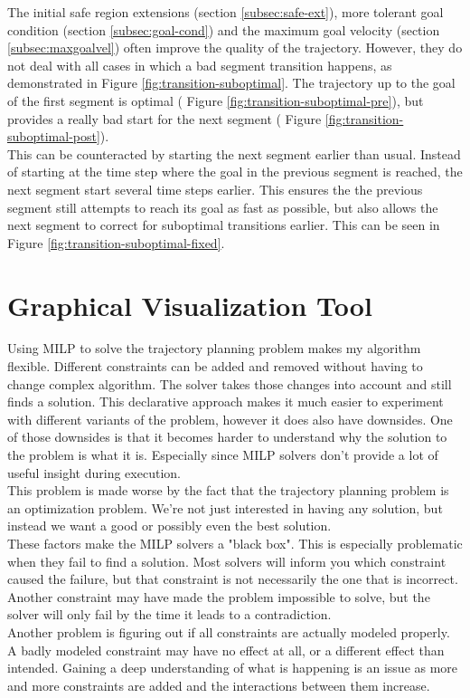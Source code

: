 The initial safe region extensions (section \ref{subsec:safe-ext}), more tolerant goal condition (section \ref{subsec:goal-cond}) and the maximum goal velocity (section \ref{subsec:maxgoalvel}) often improve the quality of the trajectory. However, they do not deal with all cases in which a bad segment transition happens, as demonstrated in Figure \ref{fig:transition-suboptimal}. The trajectory up to the goal of the first segment is optimal ( Figure \ref{fig:transition-suboptimal-pre}), but provides a really bad start for the next segment ( Figure \ref{fig:transition-suboptimal-post}). \\
This can be counteracted by starting the next segment earlier than usual. Instead of starting at the time step where the goal in the previous segment is reached, the next segment start several time steps earlier. This ensures the the previous segment still attempts to reach its goal as fast as possible, but also allows the next segment to correct for suboptimal transitions earlier. This can be seen in Figure \ref{fig:transition-suboptimal-fixed}.


\section{Graphical Visualization Tool }
\label{section:visual}
Using MILP to solve the trajectory planning problem makes my algorithm flexible. Different constraints can be added and removed without having to change complex algorithm. The solver takes those changes into account and still finds a solution.
This declarative approach makes it much easier to experiment with different variants of the problem, however it does also have downsides. One of those downsides is that it becomes harder to understand why the solution to the problem is what it is. Especially since MILP solvers don't provide a lot of useful insight during execution.\\
This problem is made worse by the fact that the trajectory planning problem is an optimization problem. We're not just interested in having any solution, but instead we want a good or possibly even the best solution.\\
These factors make the MILP solvers a "black box". This is especially problematic when they fail to find a solution. Most solvers will inform you which constraint caused the failure, but that constraint is not necessarily the one that is incorrect. Another constraint may have made the problem impossible to solve, but the solver will only fail by the time it leads to a contradiction.\\
Another problem is figuring out if all constraints are actually modeled properly. A badly modeled constraint may have no effect at all, or a different effect than intended. Gaining a deep understanding of what is happening is an issue as more and more constraints are added and the interactions between them increase.\\

